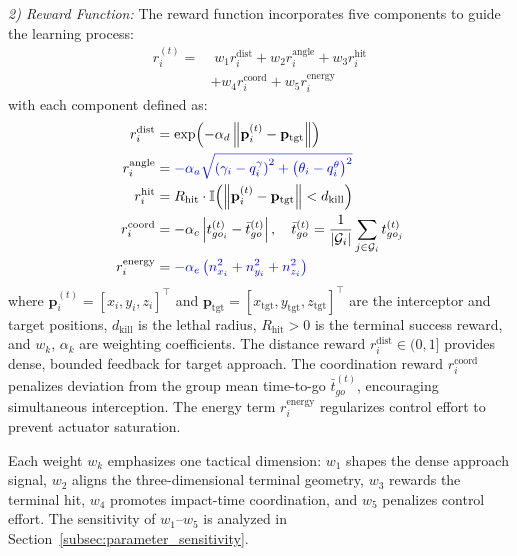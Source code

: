 \documentclass[lettersize,journal]{IEEEtran}
\newcommand{\hladd}[1]{{\color{blue}#1}}
\begin{document}
\emph{2) Reward Function:} The reward function incorporates five components to guide the learning process:
\begin{equation}
\label{eq:reward_function}
\begin{split}
r_i^{(t)} =& \; w_1 r_i^{\text{dist}} + w_2 r_i^{\text{angle}} + w_3 r_i^{\text{hit}} \\
&+ w_4 r_i^{\text{coord}} + w_5 r_i^{\text{energy}}
\end{split}
\end{equation}
with each component defined as:
\begin{align}
r_i^{\text{dist}} &= \exp\!\left(-\alpha_d \left\|\mathbf{p}_i^{(t)} - \mathbf{p}_{\text{tgt}}\right\|\right) \label{eq:r_dist}\\
r_i^{\text{angle}} &= \hladd{-\alpha_a\sqrt{\left(\gamma_i-q_i^{\gamma}\right)^2+\left(\theta_i-q_i^{\theta}\right)^2}} \label{eq:r_angle}\\
r_i^{\text{hit}} &= R_{\text{hit}} \cdot \mathbb{I}\!\left(\left\|\mathbf{p}_i^{(t)} - \mathbf{p}_{\text{tgt}}\right\| < d_{\text{kill}}\right) \label{eq:r_hit}\\
r_i^{\text{coord}} &= -\alpha_c \left| t_{go_i}^{(t)} - \bar{t}_{go}^{(t)} \right|, \quad \bar{t}_{go}^{(t)} = \frac{1}{|\mathcal{G}_i|}\sum_{j \in \mathcal{G}_i} t_{go_j}^{(t)} \label{eq:r_coord}\\
r_i^{\text{energy}} &= \hladd{-\alpha_e\left(n_{x_i}^2+n_{y_i}^2+n_{z_i}^2\right)} \label{eq:r_energy}
\end{align}
where $\mathbf{p}_i^{(t)}=[x_i,y_i,z_i]^\top$ and $\mathbf{p}_{\mathrm{tgt}}=[x_{\mathrm{tgt}},y_{\mathrm{tgt}},z_{\mathrm{tgt}}]^\top$ are the interceptor and target positions, $d_{\text{kill}}$ is the lethal radius, $R_{\text{hit}} > 0$ is the terminal success reward, and $w_k$, $\alpha_k$ are weighting coefficients. The distance reward $r_i^{\text{dist}} \in (0,1]$ provides dense, bounded feedback for target approach. 
The coordination reward $r_i^{\text{coord}}$ penalizes deviation from the group mean time-to-go $\bar{t}_{go}^{(t)}$, encouraging simultaneous interception.
The energy term $r_i^{\text{energy}}$ regularizes control effort to prevent actuator saturation.

\hladd{Each weight $w_k$ emphasizes one tactical dimension: $w_1$ shapes the dense approach signal, $w_2$ aligns the three-dimensional terminal geometry, $w_3$ rewards the terminal hit, $w_4$ promotes impact-time coordination, and $w_5$ penalizes control effort. The sensitivity of $w_1$--$w_5$ is analyzed in Section~\ref{subsec:parameter_sensitivity}.}
\end{document}

